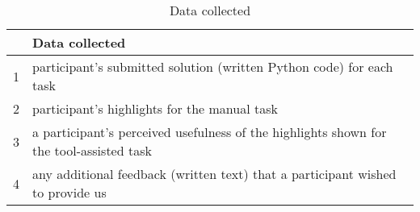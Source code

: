 \begin{table}[h!]
\centering     
\caption{Data collected}
\begin{small}
\begin{tabular}{ll}
\hline    
\textbf{} & \textbf{Data collected}  \\ 
\hline
\hline
1 & 
\parbox[l][0.8cm][c]{11cm}{
    participant's submitted solution (written Python code) for each task
}  
\\
%
2 & 
\parbox[l][0.8cm][c]{11cm}{
     participant's highlights for the manual task
}  \\
3 & 
\parbox[l][1cm][c]{11cm}{
    a participant's perceived usefulness of the highlights shown for the tool-assisted task
}  \\
4 & 
\parbox[l][0.8cm][c]{11cm}{
    any additional feedback (written text) that a participant wished to provide us
}  \\
\hline
\end{tabular}
\end{small}
\smallskip
\label{tbl:experiment-data}
\end{table}
    
